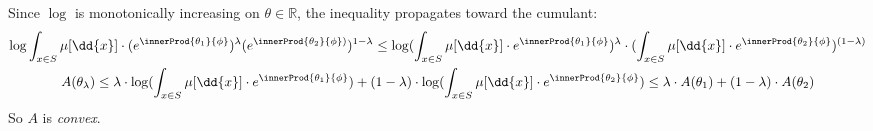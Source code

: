 Since $\log$ is
monotonically increasing 
on $\theta \in \mathbb{R}$,
the inequality propagates 
toward the cumulant:
\begin{gather*}
    \log 
    \int _{x\in S} 
    \mu[ \dd{x} ] 
\cdot
    ( e^{
            \innerProd
            { \theta_{1} }
            {\phi} } ) 
    ^{\lambda} 
    ( e^{
        \innerProd
        { \theta_{2} }
        {\phi} ) } 
    ) 
    ^{1 - \lambda} 
\leq 
    \log 
( 
        \int _{x\in S} \mu[ \dd{x} ] 
        \cdot
        e^ 
        { \innerProd
        { \theta_{1} } {\phi}  
        }
)  
^{\lambda} 
\cdot 
( 
        \int _{x\in S} \mu[ \dd{x} ] 
        \cdot
        e^ 
        {  \innerProd
           { \theta_{2} } {\phi}  
        }
) 
^{(1 - \lambda)} 
\\ 
    A (\theta _{\lambda})
\leq 
    \lambda  \cdot 
    \log 
    ( 
        \int _{x\in S} \mu[ \dd{x} ] 
        \cdot
        e^ 
        { \innerProd
        { \theta_{1} } {\phi}  
        }
    )   
+ 
    (1 - \lambda)  \cdot  
    \log 
    ( 
        \int _{x\in S} \mu[ \dd{x} ] 
        \cdot
        e^ 
        {  \innerProd
           { \theta_{2} } {\phi}  
        }
    ) 
\leq 
    \lambda \cdot A (\theta _{1})
    + (1 - \lambda) 
\cdot 
    A (\theta _{2})
\end{gather*}
So $A$ is {\it convex}.


